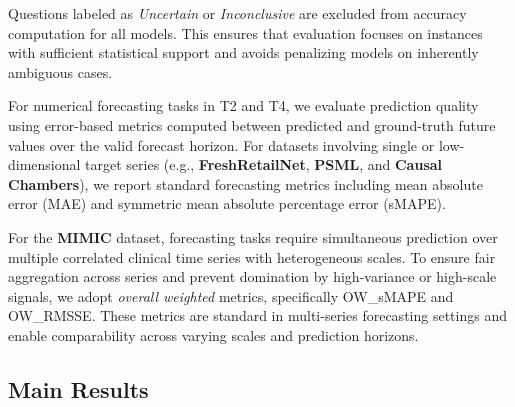 Questions labeled as \emph{Uncertain} or \emph{Inconclusive} are excluded from accuracy computation for all models. This ensures that evaluation focuses on instances with sufficient statistical support and avoids penalizing models on inherently ambiguous cases.

For numerical forecasting tasks in T2 and T4, we evaluate prediction quality using error-based metrics computed between predicted and ground-truth future values over the valid forecast horizon. For datasets involving single or low-dimensional target series (e.g., \textbf{FreshRetailNet}, \textbf{PSML}, and \textbf{Causal Chambers}), we report standard forecasting metrics including mean absolute error (MAE) and symmetric mean absolute percentage error (sMAPE).

For the \textbf{MIMIC} dataset, forecasting tasks require simultaneous prediction over multiple correlated clinical time series with heterogeneous scales. To ensure fair aggregation across series and prevent domination by high-variance or high-scale signals, we adopt \emph{overall weighted} metrics, specifically OW\_sMAPE and OW\_RMSSE. These metrics are standard in multi-series forecasting settings and enable comparability across varying scales and prediction horizons.






\subsection{Main Results}

